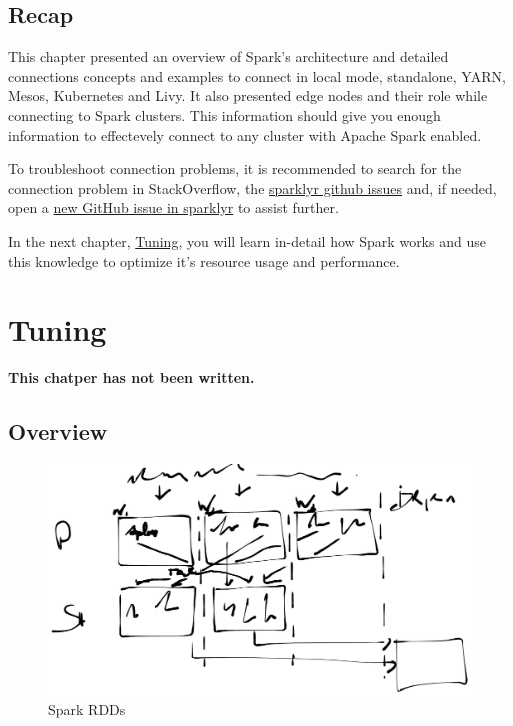 \documentclass[]{book}
\theoremstyle{definition}
\theoremstyle{definition}
\theoremstyle{definition}
\theoremstyle{remark}
\begin{document}
\hypertarget{recap-2}{%
\section{Recap}\label{recap-2}}

This chapter presented an overview of Spark's architecture and detailed
connections concepts and examples to connect in local mode, standalone,
YARN, Mesos, Kubernetes and Livy. It also presented edge nodes and their
role while connecting to Spark clusters. This information should give
you enough information to effectevely connect to any cluster with Apache
Spark enabled.

To troubleshoot connection problems, it is recommended to search for the
connection problem in StackOverflow, the
\href{https://github.com/rstudio/sparklyr/issues}{sparklyr github
issues} and, if needed, open a
\href{https://github.com/rstudio/sparklyr/issues/new}{new GitHub issue
in sparklyr} to assist further.

In the next chapter, \protect\hyperlink{tuning}{Tuning}, you will learn
in-detail how Spark works and use this knowledge to optimize it's
resource usage and performance.

\hypertarget{tuning}{%
\chapter{Tuning}\label{tuning}}

\textbf{This chatper has not been written.}

\hypertarget{overview-3}{%
\section{Overview}\label{overview-3}}

\begin{figure}

{\centering \includegraphics[width=29.36in]{images/07-tuning-spark-rdds} 

}

\caption{Spark RDDs}\label{fig:unnamed-chunk-72}
\end{figure}
\end{document}
